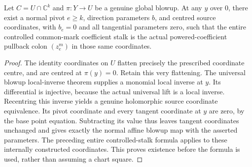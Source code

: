 \begin{theorem}
\label{hir:actual-centre-weighted-chart-stalk}
\leanok
Let $C=U\cap\mathbb C^k$ and $\pi:Y\to U$ be a genuine global blowup. At any $y$ over $0$, there exist a normal pivot $e\ge k$, direction parameters $b$, and centred source coordinates, with $b_e=0$ and all tangential parameters zero, such that the entire controlled common-mark coefficient stalk is the actual powered-coefficient pullback colon $(z_e^m)$ in those same coordinates.
\end{theorem}
\begin{proof}
The identity coordinates on $U$ flatten precisely the prescribed coordinate centre, and are centred at $\pi(y)=0$. Retain this very flattening. The universal blowup local-inverse theorem supplies a monomial local inverse at $y$. Its differential is injective, because the actual universal lift is a local inverse. Recentring this inverse yields a genuine holomorphic source coordinate equivalence. Its pivot coordinate and every tangent coordinate at $y$ are zero, by the base point equation. Subtracting its value thus leaves tangent coordinates unchanged and gives exactly the normal affine blowup map with the asserted parameters. The preceding entire controlled-stalk formula applies to these internally constructed coordinates. This proves existence before the formula is used, rather than assuming a chart square.
\end{proof}

